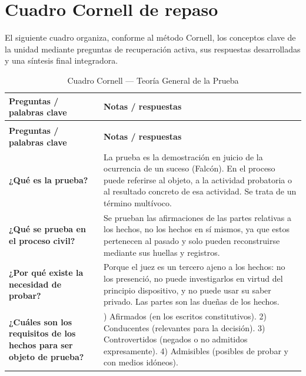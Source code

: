 \documentclass[12pt,oneside]{book}
\begin{document}
\section{Cuadro Cornell de repaso}

El siguiente cuadro organiza, conforme al método Cornell, los conceptos clave de la unidad mediante preguntas de recuperación activa, sus respuestas desarrolladas y una síntesis final integradora.

\begin{longtable}{
    >{\raggedright\arraybackslash}p{}
    >{\raggedright\arraybackslash}p{}
}
\caption{Cuadro Cornell — Teoría General de la Prueba} \\
\toprule
\textbf{Preguntas / palabras clave} & \textbf{Notas / respuestas} \\
\midrule
\endfirsthead

\multicolumn{2}{c}{\textit{(Continuación del Cuadro Cornell — Teoría General de la Prueba)}} \\
\toprule
\textbf{Preguntas / palabras clave} & \textbf{Notas / respuestas} \\
\midrule
\endhead

\bottomrule
\endfoot

\bottomrule
\endlastfoot

\textbf{¿Qué es la prueba?} &
La prueba es la demostración en juicio de la ocurrencia de un suceso (Falcón). En el proceso puede referirse al objeto, a la actividad probatoria o al resultado concreto de esa actividad. Se trata de un término multívoco. \\

\textbf{¿Qué se prueba en el proceso civil?} &
Se prueban las afirmaciones de las partes relativas a los hechos, no los hechos en sí mismos, ya que estos pertenecen al pasado y solo pueden reconstruirse mediante sus huellas y registros. \\

\textbf{¿Por qué existe la necesidad de probar?} &
Porque el juez es un tercero ajeno a los hechos: no los presenció, no puede investigarlos en virtud del principio dispositivo, y no puede usar su saber privado. Las partes son las dueñas de los hechos. \\

\textbf{¿Cuáles son los requisitos de los hechos para ser objeto de prueba?} &
1) Afirmados (en los escritos constitutivos). 2) Conducentes (relevantes para la decisión). 3) Controvertidos (negados o no admitidos expresamente). 4) Admisibles (posibles de probar y con medios idóneos). \\


\end{longtable}
\end{document}
